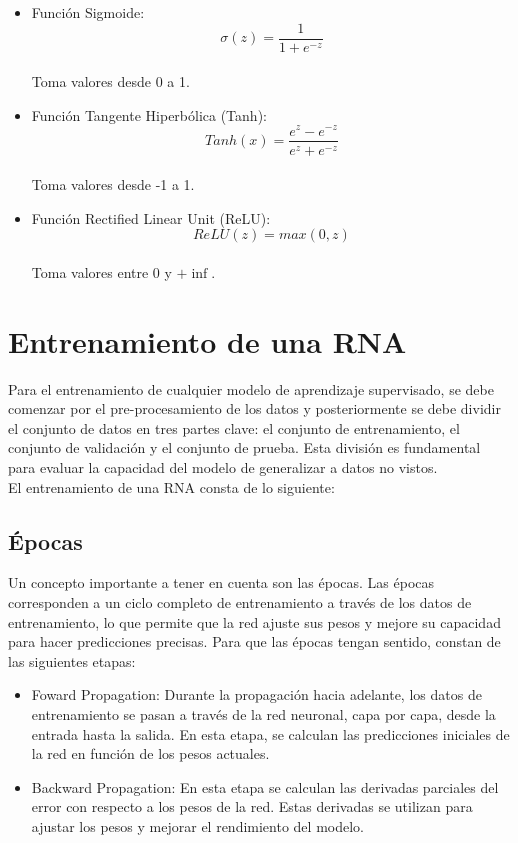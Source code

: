\documentclass[journal]{IEEEtai}
\begin{document}
\begin{itemize}
\item Función Sigmoide:\\ \[ \sigma(z) = \frac{1}{1+e^{-z}} \] \\ Toma valores desde 0 a 1.\\ 
\item Función Tangente Hiperbólica (Tanh): \\ \[  Tanh(x) = \frac{e^{z} - e^{-z}}{e^{z} + e^{-z}} \] \\ Toma valores desde -1 a 1. \\
\item Función Rectified Linear Unit (ReLU): \\ \[  ReLU(z) = max(0, z) \] \\ Toma valores entre 0  y $+\inf$. 
\end{itemize}

\section{Entrenamiento de una RNA} 

Para el entrenamiento de cualquier modelo de aprendizaje supervisado, se debe comenzar por el pre-procesamiento de los datos y posteriormente se debe dividir el conjunto de datos en tres partes clave: el conjunto de entrenamiento, el conjunto de validación y el conjunto de prueba. Esta división es fundamental para evaluar la capacidad del modelo de generalizar a datos no vistos. \\

El entrenamiento de una RNA consta de lo siguiente:

\subsection{Épocas}

Un concepto importante a tener en cuenta son las épocas. Las épocas corresponden a un ciclo completo de entrenamiento a través de los datos de entrenamiento, lo que permite que la red ajuste sus pesos y mejore su capacidad para hacer predicciones precisas. Para que las épocas tengan sentido, constan de las siguientes etapas:
\begin{itemize}
\item	Foward Propagation: Durante la propagación hacia adelante, los datos de entrenamiento se pasan a través de la red neuronal, capa por capa, desde la entrada hasta la salida. En esta etapa, se calculan las predicciones iniciales de la red en función de los pesos actuales.
\item	Backward Propagation: En esta etapa se calculan las derivadas parciales del error con respecto a los pesos de la red. Estas derivadas se utilizan para ajustar los pesos y mejorar el rendimiento del modelo. 
\end{itemize}
\end{document}
